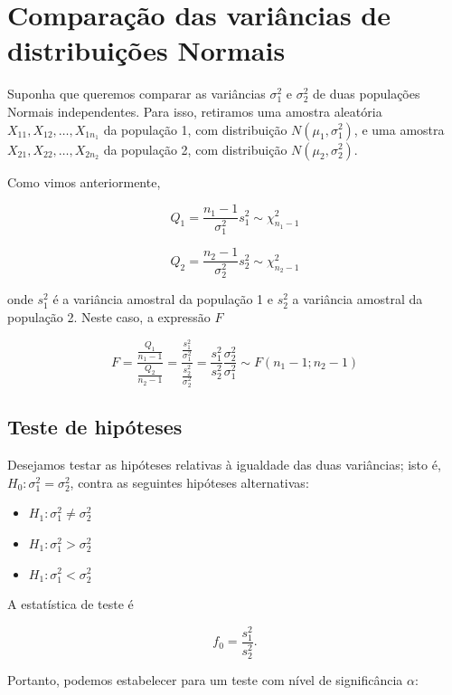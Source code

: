 \documentclass[
]{book}
\providecommand{\tightlist}{%
  \setlength{\itemsep}{0pt}\setlength{\parskip}{0pt}}
\begin{document}
\hypertarget{comparauxe7uxe3o-das-variuxe2ncias-de-distribuiuxe7uxf5es-normais}{%
\section{Comparação das variâncias de distribuições Normais}\label{comparauxe7uxe3o-das-variuxe2ncias-de-distribuiuxe7uxf5es-normais}}

Suponha que queremos comparar as variâncias \(\sigma^2_1\) e \(\sigma^2_2\) de duas populações Normais independentes. Para isso, retiramos uma amostra aleatória \(X_{11},X_{12},\ldots,X_{1n_1}\) da população 1, com distribuição \(N(\mu_1,\sigma^2_1)\), e uma amostra \(X_{21},X_{22},\ldots,X_{2n_2}\) da população 2, com distribuição \(N(\mu_2,\sigma^2_2)\).

Como vimos anteriormente,

\[Q_1=\frac{n_1-1}{\sigma^2_1}s^2_1\sim\chi^2_{n_1-1}\]

\[Q_2=\frac{n_2-1}{\sigma^2_2}s^2_2\sim\chi^2_{n_2-1}\]

onde \(s^2_1\) é a variância amostral da população 1 e \(s^2_2\) a variância amostral da população 2. Neste caso, a expressão \(F\)

\[F=\frac{\frac{Q_1}{n_1-1}}{\frac{Q_2}{n_2-1}}=\frac{\frac{s^2_1}{\sigma^2_1}}{\frac{s^2_2}{\sigma^2_2}}=\frac{s^2_1}{s^2_2}\frac{\sigma^2_2}{\sigma^2_1}\sim F(n_1-1;n_2-1)\]

\hypertarget{teste-de-hipuxf3teses-2}{%
\subsection{Teste de hipóteses}\label{teste-de-hipuxf3teses-2}}

Desejamos testar as hipóteses relativas à igualdade das duas variâncias; isto é, \(H_0:\sigma^2_1=\sigma^2_2\), contra as seguintes hipóteses alternativas:

\begin{itemize}
\tightlist
\item
  \(H_1: \sigma^2_1\ne\sigma^2_2\)
\item
  \(H_1: \sigma^2_1>\sigma^2_2\)
\item
  \(H_1: \sigma^2_1<\sigma^2_2\)
\end{itemize}

A estatística de teste é

\[f_0=\frac{s^2_1}{s^2_2}.\]

Portanto, podemos estabelecer para um teste com nível de significância \(\alpha\):
\end{document}
